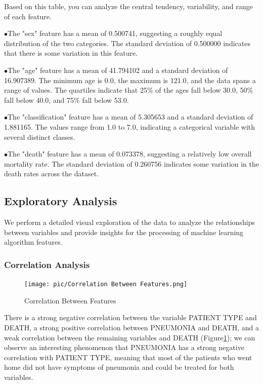 \documentclass[
  journal=medium,
  manuscript=Report,
  year=2023,
  volume=37,
]{cup-journal}
\begin{document}
Based on this table, you can analyze the central tendency, variability, and range of each feature.

$\bullet$The "sex" feature has a mean of 0.500741, suggesting a roughly equal distribution of the two categories. The standard deviation of 0.500000 indicates that there is some variation in this feature.

$\bullet$The "age" feature has a mean of 41.794102 and a standard deviation of 16.907389. The minimum age is 0.0, the maximum is 121.0, and the data spans a range of values. The quartiles indicate that 25\% of the ages fall below 30.0, 50\% fall below 40.0, and 75\% fall below 53.0.

$\bullet$The "classification" feature has a mean of 5.305653 and a standard deviation of 1.881165. The values range from 1.0 to 7.0, indicating a categorical variable with several distinct classes.

$\bullet$The "death" feature has a mean of 0.073378, suggesting a relatively low overall mortality rate. The standard deviation of 0.260756 indicates some variation in the death rates across the dataset.

\subsection{Exploratory Analysis}

We perform a detailed visual exploration of the data to analyze the relationships between variables and provide insights for the processing of machine learning algorithm features.

\subsubsection{Correlation Analysis}

\begin{figure}[t]
    \centering
    \texttt{[image: pic/Correlation Between Features.png]}
    \caption{Correlation Between Features}
    \label{Correlation}
\end{figure}

There is a strong negative correlation between the variable PATIENT TYPE and DEATH, a strong positive correlation between PNEUMONIA and DEATH, and a weak correlation between the remaining variables and DEATH (Figure\ref{Correlation}); we can observe an interesting phenomenon that PNEUMONIA has a strong negative correlation with PATIENT TYPE, meaning that most of the patients who went home did not have symptoms of pneumonia and could be treated for both variables.
\end{document}
